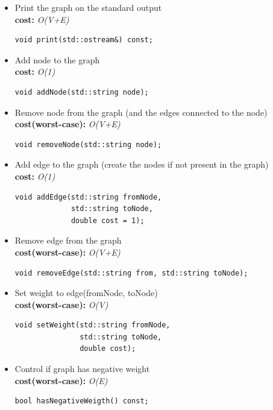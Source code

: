 \documentclass[10pt,a4paper]{article}
\begin{document}
\begin{itemize}
\item Print the graph on the standard output\\
\textbf{cost:} \emph{O(V+E)}
\begin{lstlisting}
void print(std::ostream&) const;  
\end{lstlisting}
    
\item Add node to the graph\\
\textbf{cost:} \emph{O(1)}
\begin{lstlisting}
void addNode(std::string node);     
\end{lstlisting}

\item Remove node from the graph (and the edges connected to the node)\\
\textbf{cost(worst-case):} \emph{O(V+E)}
\begin{lstlisting}
void removeNode(std::string node);    
\end{lstlisting}
   
    
\item Add edge to the graph (create the nodes if not present in the graph)\\
\textbf{cost:} \emph{O(1)}
\begin{lstlisting}
void addEdge(std::string fromNode, 
             std::string toNode, 
             double cost = 1);   
\end{lstlisting}  

\item Remove edge from the graph\\
\textbf{cost(worst-case):} \emph{O(V+E)}
\begin{lstlisting}
void removeEdge(std::string from, std::string toNode);    
\end{lstlisting}
   
\item Set weight to edge(fromNode, toNode)\\
\textbf{cost(worst-case):} \emph{O(V)}
\begin{lstlisting}
void setWeight(std::string fromNode, 
               std::string toNode, 
               double cost);   
\end{lstlisting}

\item Control if graph has negative weight\\
\textbf{cost(worst-case):} \emph{O(E)}
\begin{lstlisting}
bool hasNegativeWeigth() const;   
\end{lstlisting}
 

\end{itemize}
\end{document}
